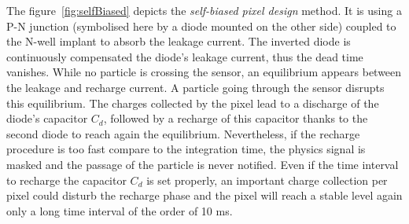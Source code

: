     The figure~\ref{fig:selfBiased} depicts the \textit{self-biased pixel design} method\cite{Deveaux2009}.
    It is using a P-N junction (symbolised here by a diode mounted on the other side) coupled to the N-well implant to absorb the leakage current.
    The inverted diode is continuously compensated the diode's leakage current, thus the dead time vanishes.
    While no particle is crossing the sensor, an equilibrium appears between the leakage and recharge current.
    A particle going through the sensor disrupts this equilibrium.
    The charges collected by the pixel lead to a discharge of the diode's capacitor $C_d$, followed by a recharge of this capacitor thanks to the second diode to reach again the equilibrium.
    Nevertheless, if the recharge procedure is too fast compare to the integration time, the physics signal is masked and the passage of the particle is never notified.
    Even if the time interval to recharge the capacitor $C_d$ is set properly, an important charge collection per pixel could disturb the recharge phase and the pixel will reach a stable level again only a long time interval of the order of 10 ms.

